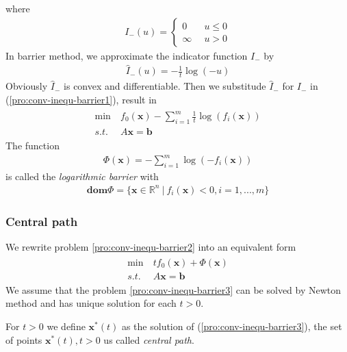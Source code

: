 where
\begin{align}
    I_{-}(u) = \left\{
        \begin{array}{ll}
            0 \quad &u \leq 0 \\
            \infty &u > 0
        \end{array}\right.
\end{align}
In barrier method, we approximate the indicator function $I_{-}$ by
\begin{align}
    \hat{I}_{-}(u) = - \frac{1}{t}\log (-u)
\end{align}
Obviously $\hat{I}_{-}$ is convex and differentiable.
Then we substitude $\hat{I}_{-}$ for $I_{-}$ in (\ref{pro:conv-inequ-barrier1}),
result in
\begin{align}
    \begin{array}{ll}
        \min \ &f_0(\mathbf{x}) - \sum_{i=1}^m \frac{1}{t} \log (f_i(\mathbf{x})) \\
        s.t. \ &A\mathbf{x} = \mathbf{b}
    \end{array}
    \label{pro:conv-inequ-barrier2}
\end{align}
The function
\begin{align}
    \Phi(\mathbf{x}) = - \sum_{i=1}^m \log (-f_i(\mathbf{x}))
\end{align}
is called the \emph{logarithmic barrier} with
\begin{align}
    \mathbf{dom}\Phi = \{ \mathbf{x} \in \mathbb{R}^n \ | \ f_i(\mathbf{x}) < 0, i = 1,...,m \}
\end{align}

\subsubsection{Central path}
We rewrite problem \ref{pro:conv-inequ-barrier2}
into an equivalent form
\begin{align}
    \begin{array}{ll}
        \min \ &tf_0(\mathbf{x}) + \Phi(\mathbf{x}) \\
        s.t. \ &A\mathbf{x} = \mathbf{b}
    \end{array}
    \label{pro:conv-inequ-barrier3}
\end{align}
We assume that the problem \ref{pro:conv-inequ-barrier3}
can be solved by Newton method and has unique solution for
each $t > 0$.
\par
For $t > 0$ we define $\mathbf{x}^*(t)$ as the solution of
(\ref{pro:conv-inequ-barrier3}), the set of points $\mathbf{x}^*(t), t>0$
us called \emph{central path}.


